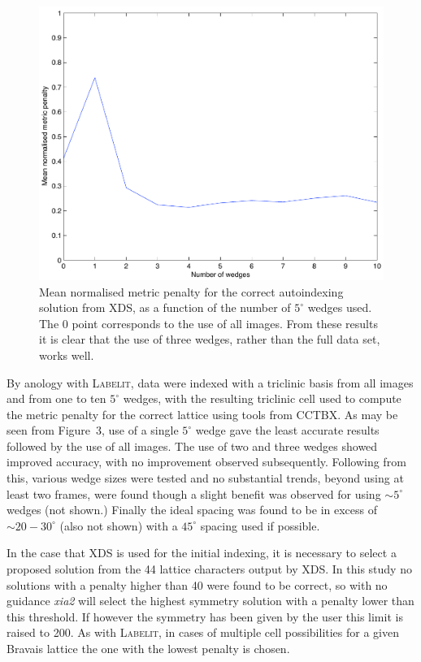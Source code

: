 \documentclass[preprint,pdf]{iucr}
\begin{document}
\begin{figure}
\caption{Mean normalised metric penalty for the correct autoindexing 
solution from XDS, as a function of the number of $5^{\circ}$ wedges used.
The 0 point corresponds to the use of all images. From these results it is
clear that the use of three wedges, rather than the full data set, works
well.
\label{figure:xds_n_images}}
\centering
\includegraphics[scale=0.5]{figures/xds_n_wedges.pdf}
\end{figure}

By anology with \textsc{Labelit}, data were indexed with a triclinic basis
from all images and from one to ten $5^{\circ}$ wedges, with the
resulting triclinic cell used to
compute the metric penalty for the correct lattice
using tools from CCTBX. As may be seen
from Figure~3,
use of a single $5^{\circ}$ wedge gave the least accurate
results followed by the use of all images. The use of two and three
wedges showed improved accuracy, with no improvement observed
subsequently. Following from this, various wedge sizes were tested and
no substantial trends, beyond using at least two frames, were found
though a slight benefit was observed for using $\sim 5^{\circ}$ wedges
(not shown.) Finally the ideal spacing was found to be 
in excess of $\sim 20 - 30^{\circ}$ (also not shown) with a
$45^{\circ}$ spacing used if possible.  

In the case that XDS is used for the initial indexing, it is necessary
to select a proposed solution from the 44 lattice characters output by
XDS. In this study no solutions with a penalty higher than 40 were
found to be correct, so with no guidance \emph{xia2} will select the
highest symmetry solution with a penalty lower than this threshold. If
however the symmetry has been given by the user this limit is raised
to 200. As with \textsc{Labelit}, in cases of multiple cell possibilities for a
given Bravais lattice the one with the lowest penalty is chosen.
\end{document}

